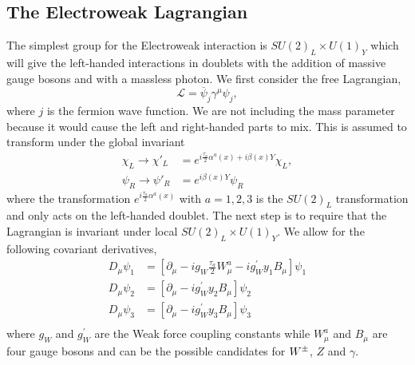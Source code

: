 \subsection{The Electroweak Lagrangian}

The simplest group for the Electroweak interaction is $SU(2)_L\times U(1)_Y$ which will give the left-handed interactions in doublets with the addition of massive gauge bosons \W{} and \Z{} with a massless photon. We first consider the free Lagrangian,
\begin{equation}\label{WeakL}
\mathcal{L}=\overline{\psi}_j\gamma^\mu\psi_j,
\end{equation}
where $j$ is the fermion wave function. We are not including the mass parameter because it would cause the left and right-handed parts to mix.  This is assumed to transform under the global invariant
\begin{equation}\label{WeakGlobal}
\begin{split}
\chi_L\rightarrow\chi'_L&=e^{i\frac{\tau_a}{2}\alpha^a(x)+i\beta(x)Y}\chi_L, \\
\psi_R\rightarrow\psi'_R&=e^{i\beta(x)Y}\psi_R
\end{split}
\end{equation}
where the transformation $e^{i\frac{\tau_a}{2}\alpha^a(x)}$ with $a = 1, 2, 3$ is the $SU(2)_L$ transformation and only acts on the left-handed doublet. The next step is to require that the Lagrangian is invariant under local $SU(2)_L\times U(1)_Y$. We allow for the following covariant derivatives,
\begin{equation}
\begin{split}
D_\mu\psi_1&=[\partial_\mu-ig_W\frac{\tau_a}{2}W_\mu^a-ig_W^\prime y_1 B_\mu]\psi_1 \\
D_\mu\psi_2&=[\partial_\mu-ig_W^\prime y_2 B_\mu]\psi_2 \\
D_\mu\psi_3&=[\partial_\mu-ig_W^\prime y_3 B_\mu]\psi_3 \\
\end{split}
\end{equation}
where $g_W$ and $g_W^{\prime}$ are the Weak force coupling constants while $W_\mu^a$ and $B_\mu$ are four gauge bosons and can be the possible candidates for $W^\pm$, $Z$ and $\gamma$. 

